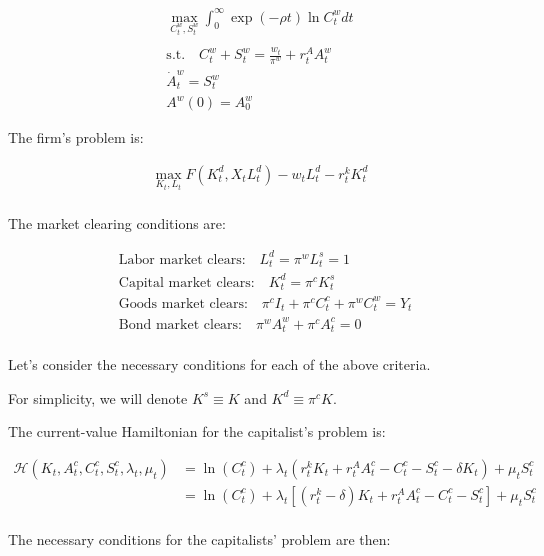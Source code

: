 \begin{align}
    \underset{C^w_t, S^w_t}{\max} \int_0^{\infty} \exp (-\rho t) \ln C_t^w d t \\
    \quad \\
    \text{s.t.} \quad C_t^w + S_t^w = \frac{w_t}{\pi^w} + r_t^A A_t^w \\
    \dot{A}_t^w = S_t^w \\
    A^w(0) = A^w_0
\end{align}

The firm's problem is:

\begin{align}
    \underset{K_t, L_t}{\max} F(K^d_t, X_t L^d_t) - w_t L^d_t - r_t^k K^d_t \label{eq:pset_2023_24_ps2_q1_golosov_firm_problem} \\
\end{align}

The market clearing conditions are:

\begin{align}
    &\text{Labor market clears:} \quad L_t^d = \pi^w L^s_t = 1 \\
    &\text{Capital market clears:} \quad K_t^d = \pi^c K_t^s \\
    &\text{Goods market clears:} \quad \pi^c I_t + \pi^c C_t^c + \pi^w C_t^w = Y_t \label{eq:pset_2023_24_ps2_q1_golosov_goods_market_clears} \\
    &\text{Bond market clears:} \quad \pi^w A_t^w + \pi^c A_t^c = 0 \label{eq:pset_2023_24_ps2_q1_golosov_bond_market_clears} \\
\end{align}

Let's consider the necessary conditions for each of the above criteria. 

For simplicity, we will denote $K^s \equiv K$ and $K^d \equiv \pi^c K$.

The current-value Hamiltonian for the capitalist's problem is:

\begin{align}
    \mathcal{H}(K_t, A_t^c, C_t^c, S_t^c, \lambda_t, \mu_t)
    &= \ln(C_t^c) + \lambda_t (r_t^k K_t + r_t^A A_t^c - C_t^c - S_t^c - \delta K_t) + \mu_tS_t^c \\
    &= \ln(C_t^c) + \lambda_t [(r_t^k - \delta) K_t + r_t^A A_t^c - C_t^c - S_t^c] + \mu_tS_t^c \\
\end{align}

The necessary conditions for the capitalists' problem are then:

